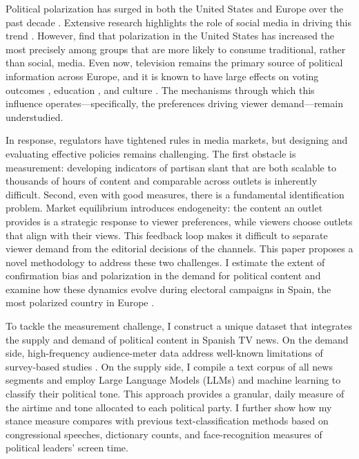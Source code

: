\documentclass[12pt]{article}
\begin{document}
	
	
	


Political polarization has surged in both the United States and Europe over the past decade \citep{IyengarLelkesLevendusky2019Origins,Reiljan2019FearAL}. Extensive research highlights the role of social media in driving this trend \citep{Zhuravskaya2020}. However, \citet{Boxell2020CrossCountryTI} find that polarization in the United States has increased the most precisely among groups that are more likely to consume traditional, rather than social, media. Even now, television remains the primary source of political information across Europe, and it is known to have large effects on voting outcomes \citep{dellavigna2007fox,gentzkow_turnout,martin2017}, education \citep{gentzkow2008preschool}, and culture \citep{jensen2009power}. The mechanisms through which this influence operates—specifically, the preferences driving viewer demand—remain understudied.


In response, regulators have tightened rules in media markets, but designing and evaluating effective policies remains challenging. The first obstacle is measurement: developing indicators of partisan slant that are both scalable to thousands of hours of content and comparable across outlets is inherently difficult. Second, even with good measures, there is a fundamental identification problem. Market equilibrium introduces endogeneity: the content an outlet provides is a strategic response to viewer preferences, while viewers choose outlets that align with their views. This feedback loop makes it difficult to separate viewer demand from the editorial decisions of the channels.
This paper proposes a novel methodology to address these two challenges. I estimate the extent of confirmation bias and polarization in the demand for political content and examine how these dynamics evolve during electoral campaigns in Spain, the most polarized country in Europe \citep{edelman_trust_2023}.

To tackle the measurement challenge, I construct a unique dataset that integrates the supply and demand of political content in Spanish TV news. On the demand side, high-frequency audience-meter data address well-known limitations of survey-based studies \citep{prior}. On the supply side, I compile a text corpus of all news segments and employ Large Language Models (LLMs) and machine learning to classify their political tone. This approach provides a granular, daily measure of the airtime and tone allocated to each political party. I further show how my stance measure compares with previous text-classification methods based on congressional speeches, dictionary counts, and face-recognition measures of political leaders’ screen time.
\end{document}

